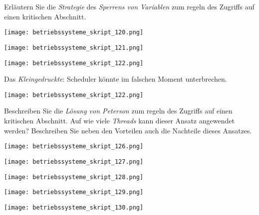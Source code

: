\documentclass{article}
\begin{document}
\begin{tcolorbox}[colback=white!10!white,colframe=lightgray!75!black,
  savelowerto=\jobname_ex.tex,breakable,enhanced,lines before break=40]

\justifying
Erläutern Sie die \textit{Strategie} des \textit{Sperrens von Variablen} zum regeln des Zugriffs auf einen kritischen Abschnitt.

\tcblower

\justifying
\begin{center}
\texttt{[image: betriebssysteme\_skript\_120.png]}
\end{center}
\begin{center}
\texttt{[image: betriebssysteme\_skript\_121.png]}
\end{center}
\begin{center}
\texttt{[image: betriebssysteme\_skript\_122.png]}
\end{center}
Das \textit{Kleingedruckte}: Scheduler könnte im falschen Moment unterbrechen.\begin{center}
\texttt{[image: betriebssysteme\_skript\_122.png]}
\end{center}

\end{tcolorbox}
\begin{tcolorbox}[colback=white!10!white,colframe=lightgray!75!black,
  savelowerto=\jobname_ex.tex,breakable,enhanced,lines before break=40]

\justifying
Beschreiben Sie die \textit{Lösung von Peterson} zum regeln des Zugriffs auf einen kritischen Abschnitt. Auf wie viele \textit{Threads} kann dieser Ansatz angewendet werden? Beschreiben Sie neben den Vorteilen auch die Nachteile dieses Ansatzes.

\tcblower

\justifying
\begin{center}
\texttt{[image: betriebssysteme\_skript\_126.png]}
\end{center}
\begin{center}
\texttt{[image: betriebssysteme\_skript\_127.png]}
\end{center}
\begin{center}
\texttt{[image: betriebssysteme\_skript\_128.png]}
\end{center}
\begin{center}
\texttt{[image: betriebssysteme\_skript\_129.png]}
\end{center}
\begin{center}
\texttt{[image: betriebssysteme\_skript\_130.png]}
\end{center}

\end{tcolorbox}
\end{document}
